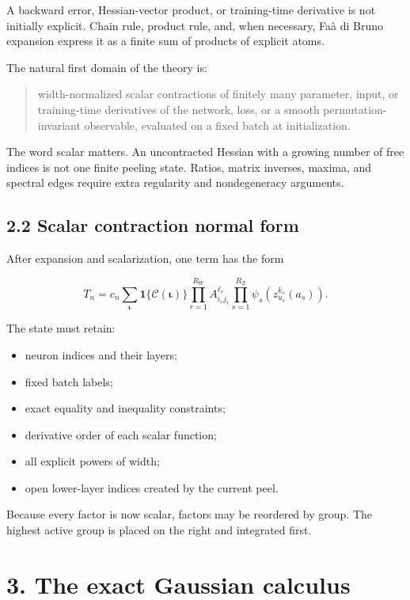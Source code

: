 A backward error, Hessian-vector product, or training-time derivative is not
initially explicit. Chain rule, product rule, and, when necessary,
Faà di Bruno expansion express it as a finite sum of products of explicit
atoms.

The natural first domain of the theory is:

\begin{quote}\itshape

width-normalized scalar contractions of finitely many parameter, input, or
training-time derivatives of the network, loss, or a smooth
permutation-invariant observable, evaluated on a fixed batch at
initialization.
\end{quote}


The word scalar matters. An uncontracted Hessian with a growing number of free
indices is not one finite peeling state. Ratios, matrix inverses, maxima, and
spectral edges require extra regularity and nondegeneracy arguments.

\subsection*{2.2 Scalar contraction normal form}


After expansion and scalarization, one term has the form

\[
T_n
=
c_n
\sum_{\boldsymbol\iota}
\mathbf 1\{\mathcal C(\boldsymbol\iota)\}
\prod_{r=1}^{R_W}A^{\ell_r}_{i_rj_r}
\prod_{s=1}^{R_Z}
\psi_s(z^{k_s}_{u_s}(a_s)).
\]


The state must retain:

\begin{itemize}
\item neuron indices and their layers;
\item fixed batch labels;
\item exact equality and inequality constraints;
\item derivative order of each scalar function;
\item all explicit powers of width;
\item open lower-layer indices created by the current peel.
\end{itemize}


Because every factor is now scalar, factors may be reordered by group. The
highest active group is placed on the right and integrated first.

\section*{3. The exact Gaussian calculus}


